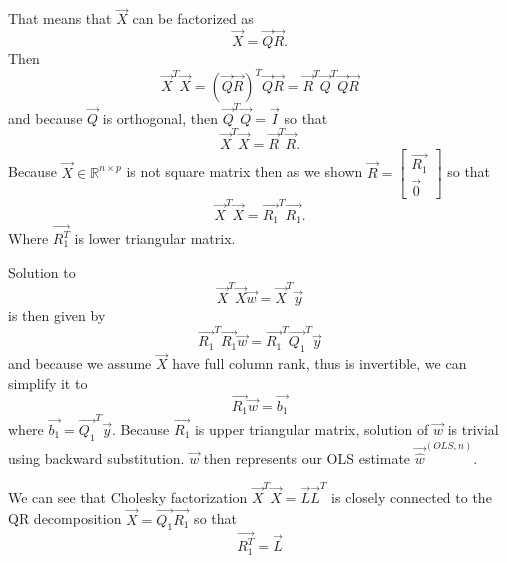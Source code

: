 That means that  $\vec{X}$ can be factorized as
\begin{equation}
    \vec{X} = \vec{Q}\vec{R}.
\end{equation}
Then
\begin{equation}
    \vec{X}^T\vec{X} = (\vec{Q}\vec{R})^T \vec{Q}\vec{R} = \vec{R}^T\vec{Q}^T\vec{Q}\vec{R}
\end{equation}
and because $\vec{Q}$ is orthogonal, then $\vec{Q}^T\vec{Q} = \vec{I}$ so that
\begin{equation}
    \vec{X}^T\vec{X} = \vec{R}^T\vec{R}.
\end{equation}
Because $\vec{X} \in  \mathbb{R}^{n \times p}$ is not square matrix then as we shown $\vec{R} = \begin{bmatrix}
    \vec{R_1} \\
    \vec{0}
\end{bmatrix}$
so that 
\begin{equation}
    \vec{X}^T\vec{X} = \vec{R_1}^T\vec{R_1}.
\end{equation}
 Where $\vec{R_1^T}$ is lower triangular matrix. 

Solution to
\begin{equation}
    \vec{X}^T\vec{X}\vec{w} = \vec{X}^T\vec{y}
\end{equation}
is then given by 
\begin{equation}
    \vec{R_1}^T\vec{R_1}\vec{w} = \vec{R_1}^T\vec{Q_1}^T \vec{y}
\end{equation}
and because we assume $\vec{X}$ have full column rank, thus is invertible, we can simplify it to
\begin{equation}
    \vec{R_1}\vec{w} = \vec{b_1}
\end{equation}
where $ \vec{b_1} = \vec{Q_1}^T \vec{y}$. Because $\vec{R_1}$ is upper triangular matrix, solution of $\vec{w}$ is trivial using backward substitution.  $\vec{w}$ then represents our OLS estimate $\vec{\hat{w}}^{(OLS,n)}$.

\begin{note}
        We can see that Cholesky factorization  $\vec{X}^T\vec{X} = \vec{L}\vec{L}^T$ is closely connected to the QR decomposition $\vec{X} = \vec{Q_1}\vec{R_1}$ so that  
        \begin{equation} \label{qrcholesky}
                \vec{R_1^T} = \vec{L}
            \end{equation}
\end{note}


